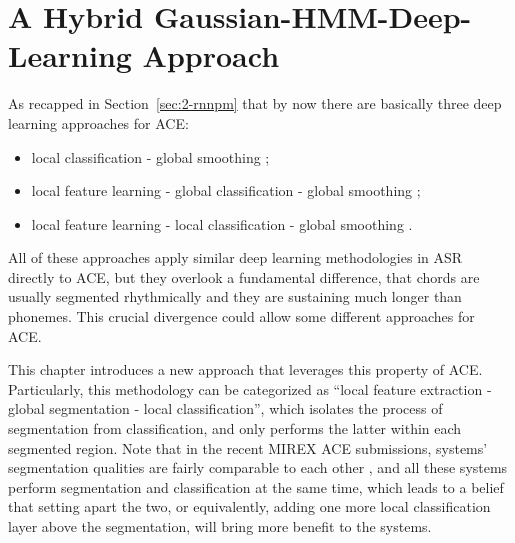 
\chapter{A Hybrid Gaussian-HMM-Deep-Learning Approach}\label{cp:ghmm} %


\ifpdf
    \graphicspath{{X/figures/PNG/}{X/figures/PDF/}{X/figures/}}
\else
    \graphicspath{{X/figures/EPS/}{X/figures/}}
\fi

As recapped in Section~\ref{sec:2-rnnpm} that by now there are basically three deep learning approaches for ACE:
\begin{itemize}
\item local classification - global smoothing \cite{humphrey2012rethinking};
\item local feature learning - global classification - global smoothing \cite{boulanger2013audio,sigtia2015audio};
\item local feature learning - local classification - global smoothing \cite{zhou2015chord}.
\end{itemize}
All of these approaches apply similar deep learning methodologies in ASR \cite{deng2014deep,bourlard2012connectionist} directly to ACE, but they overlook a fundamental difference, that chords are usually segmented rhythmically and they are sustaining much longer than phonemes. This crucial divergence could allow some different approaches for ACE. 

This chapter introduces a new approach that leverages this property of ACE. Particularly, this methodology can be categorized as ``local feature extraction - global segmentation - local classification'', which isolates the process of segmentation from classification, and only performs the latter within each segmented region. Note that in the recent MIREX ACE submissions, systems' segmentation qualities are fairly comparable to each other \cite{burgoyne2014comparative}, and all these systems perform segmentation and classification at the same time, which leads to a belief that setting apart the two, or equivalently, adding one more local classification layer above the segmentation, will bring more benefit to the systems.

